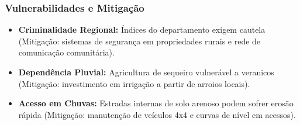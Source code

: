 \subsubsection{Vulnerabilidades e
Mitigação}

\begin{itemize}
\tightlist
\item
  \textbf{Criminalidade Regional:} Índices do departamento exigem
  cautela (Mitigação: sistemas de segurança em propriedades rurais e
  rede de comunicação comunitária).
\item
  \textbf{Dependência Pluvial:} Agricultura de sequeiro vulnerável a
  veranicos (Mitigação: investimento em irrigação a partir de arroios
  locais).
\item
  \textbf{Acesso em Chuvas:} Estradas internas de solo arenoso podem
  sofrer erosão rápida (Mitigação: manutenção de veículos 4x4 e curvas
  de nível em acessos).
\end{itemize}

